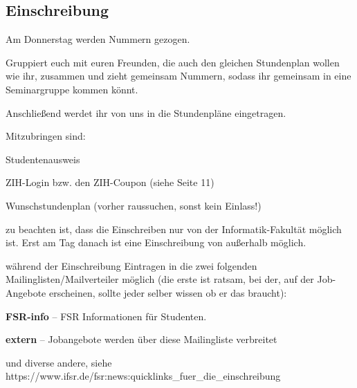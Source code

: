 \documentclass[a4paper,12pt]{report}
\begin{document}
\subsection{Einschreibung}
\begin{itemize*}
    \item Am Donnerstag werden Nummern gezogen.
    \item Gruppiert euch mit euren Freunden, die auch den gleichen Stundenplan wollen wie ihr, zusammen und zieht gemeinsam Nummern, sodass ihr gemeinsam in eine Seminargruppe kommen könnt.
    \item Anschließend werdet ihr von uns in die Stundenpläne eingetragen.
    \item Mitzubringen sind:
        \begin{itemize*}
        \item Studentenausweis
        \item ZIH-Login bzw. den ZIH-Coupon (siehe Seite 11)
        \item Wunschstundenplan (vorher raussuchen, sonst kein Einlass!)
        \item zu beachten ist, dass die Einschreiben nur von der Informatik-Fakultät möglich ist. Erst am Tag danach ist eine Einschreibung von außerhalb möglich.
    \end{itemize*}
    \item während der Einschreibung Eintragen in die zwei folgenden Mailinglisten/Mailverteiler möglich (die erste ist ratsam, bei der, auf der Job-Angebote erscheinen, sollte jeder selber wissen ob er das braucht):
        \begin{itemize*}
        \item \textbf{FSR-info} -- FSR Informationen für Studenten.
        \item \textbf{extern} -- Jobangebote werden über diese Mailingliste verbreitet
        \item und diverse andere, siehe \\ https://www.ifsr.de/fsr:news:quicklinks\_fuer\_die\_einschreibung
    \end{itemize*}
\end{itemize*}
\end{document}
